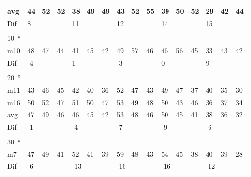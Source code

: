 \begin{table}[H]
\begin{tabular}{l|l|l|l|l|l|l|l|l|l|l|l|l|lll}
avg  &  44    &  52    & 52    &  38     &  49    &  49   & 43     & 52     & 55    & 39     & 50     & 52    & \multicolumn{1}{l|}{29}   & \multicolumn{1}{l|}{42}   & 44 \\ \hline  
Dif & \multicolumn{3}{l|}{8} & \multicolumn{3}{l|}{11} & \multicolumn{3}{l|}{12} & \multicolumn{3}{l|}{14} & \multicolumn{3}{l}{15} \\ 
 \multicolumn{16}{l}{ } \\                             
\SI{10}{\degree}   & \multicolumn{3}{l|}{} & \multicolumn{3}{l|}{} & \multicolumn{3}{l|}{} & \multicolumn{3}{l|}{} & \multicolumn{3}{l}{}   \\  \hline
m10   &  48    &  47    &  44    & 41     &  45    &  42    & 49     &  57     &  46    &  45     &  56    &  45    & \multicolumn{1}{l|}{33} & \multicolumn{1}{l|}{43} & 42 \\ \hline
Dif & \multicolumn{3}{l|}{-4} & \multicolumn{3}{l|}{1} & \multicolumn{3}{l|}{-3} & \multicolumn{3}{l|}{0} & \multicolumn{3}{l}{9}  \\ 
 \multicolumn{16}{l}{ } \\                             
\SI{20}{\degree}   & \multicolumn{3}{l|}{} & \multicolumn{3}{l|}{} & \multicolumn{3}{l|}{} & \multicolumn{3}{l|}{} & \multicolumn{3}{l}{}   \\  \hline
m11    & 43     &  46    &  45    &  42    & 40     &  36    &  52    &  47     &  43    &   49    &  47    &   37   & \multicolumn{1}{l|}{40} & \multicolumn{1}{l|}{35} & 30 \\
m16    & 50     & 52     &  47    &  51    & 50     & 47     &   53   &  49     &  48    &  50     &  43    &  46    & \multicolumn{1}{l|}{36} & \multicolumn{1}{l|}{37} & 34 \\ \hline
avg &  47    &  49    &  46    &   46   &  45    &  42    &  53    &   48    &  46    &   50    &  45    &  41    & \multicolumn{1}{l|}{38} & \multicolumn{1}{l|}{36}  &32  \\ \hline  
Dif & \multicolumn{3}{l|}{-1} & \multicolumn{3}{l|}{-4} & \multicolumn{3}{l|}{-7} & \multicolumn{3}{l|}{-9} & \multicolumn{3}{l}{-6} \\ 
 \multicolumn{16}{l}{ } \\                             
\SI{30}{\degree}   & \multicolumn{3}{l|}{} & \multicolumn{3}{l|}{} & \multicolumn{3}{l|}{} & \multicolumn{3}{l|}{} & \multicolumn{3}{l}{}   \\  \hline
m7    & 47     & 49     & 41     &  52    & 41     &  39    & 59     & 48      &  43    &   54    & 45     &   38   & \multicolumn{1}{l|}{40} & \multicolumn{1}{l|}{39} & 28 \\ \hline
Dif & \multicolumn{3}{l|}{-6} & \multicolumn{3}{l|}{-13} & \multicolumn{3}{l|}{-16} & \multicolumn{3}{l|}{-16} & \multicolumn{3}{l}{-12}                                
\end{tabular}
\end{table}



